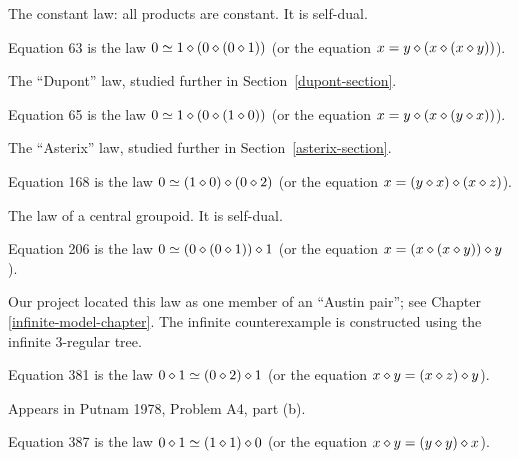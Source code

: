The constant law: all products are constant. It is self-dual.

\begin{definition}[Equation 63]\label{eq63}\leanok{}  Equation 63 is the law $0 \simeq 1 \diamond (0 \diamond (0 \diamond 1))$ (or the equation $x = y \diamond (x \diamond (x \diamond y))$).
\end{definition}

The ``Dupont'' law, studied further in Section~\ref{dupont-section}.

\begin{definition}[Equation 65]\label{eq65}\leanok{}  Equation 65 is the law $0 \simeq 1 \diamond (0 \diamond (1 \diamond 0))$ (or the equation $x = y \diamond (x \diamond (y \diamond x))$).
\end{definition}

The ``Asterix'' law, studied further in Section~\ref{asterix-section}.

\begin{definition}[Equation 168]\label{eq168}\leanok{}  Equation 168 is the law $0  \simeq  (1 \diamond 0) \diamond (0 \diamond 2)$ (or the equation $x = (y \diamond x) \diamond (x \diamond z)$).
\end{definition}

The law of a central groupoid. It is self-dual.

\begin{definition}[Equation 206]\label{eq206}\leanok{}  Equation 206 is the law $0  \simeq  (0 \diamond (0 \diamond 1)) \diamond 1$ (or the equation $x = (x \diamond (x \diamond y)) \diamond y$).
\end{definition}

Our project located this law as one member of an ``Austin pair''; see Chapter \ref{infinite-model-chapter}. The infinite counterexample is constructed using the infinite 3-regular tree.

\begin{definition}[Equation 381]\label{eq381}\leanok{}  Equation 381 is the law $0 \diamond 1  \simeq  (0 \diamond 2) \diamond 1$ (or the equation $x \diamond y = (x \diamond z) \diamond y$).
\end{definition}

Appears in Putnam 1978, Problem A4, part (b).

\begin{definition}[Equation 387]\label{eq387}\leanok{}  Equation 387 is the law $0 \diamond 1  \simeq  (1 \diamond 1) \diamond 0$ (or the equation $x \diamond y = (y \diamond y) \diamond x$).
\end{definition}

